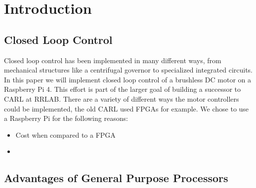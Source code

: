 \chapter{Introduction}
\label{chap:introduction}

\begin{comment}
FPGA expensive, slow and takes long to develop
RaspberryPi cheap and has hardware acceleration for SPI and PWM
Rust as new language competitive to C?
Bare-metal still necessary with modern Microprocessors and Real-time Linux?
What if we want to implement something different from linear control?

Closed loop control not a new problem
better results the higher the control frequency
Can we build a fast control loop while staying on Linux?
\end{comment}



\section{Closed Loop Control}
Closed loop control has been implemented in many different ways,
from mechanical structures like a centrifugal governor to specialized integrated circuits.
In this paper we will implement closed loop control of a brushless DC motor on a Raspberry Pi 4.
This effort is part of the larger goal of building a successor to CARL\cite{CARL} at RRLAB.
There are a variety of different ways the motor controllers could be implemented, the old CARL used FPGAs for example.
We chose to use a Raspberry Pi for the following reasons:
\begin{itemize}
    \item Cost when compared to a FPGA
    \item 
\end{itemize}

\section{Advantages of General Purpose Processors}

\section{}